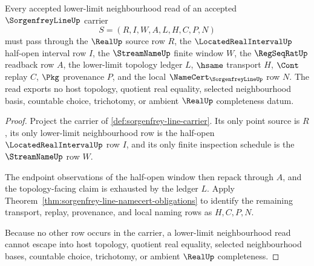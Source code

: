 \begin{theorem}
\label{thm:sorgenfrey-line-lower-limit-window-nonescape}
Every accepted lower-limit neighbourhood read of an accepted $\SorgenfreyLineUp$ carrier
$$
S=(R,I,W,A,L,H,C,P,N)
$$
must pass through the $\RealUp$ source row $R$, the $\LocatedRealIntervalUp$ half-open interval row $I$, the $\StreamNameUp$ finite window $W$, the $\RegSeqRatUp$ readback row $A$, the lower-limit topology ledger $L$, $\hsame$ transport $H$, $\Cont$ replay $C$, $\Pkg$ provenance $P$, and the local $\NameCert_{\SorgenfreyLineUp}$ row $N$. The read exports no host topology, quotient real equality, selected neighbourhood basis, countable choice, trichotomy, or ambient $\RealUp$ completeness datum.
\end{theorem}
\begin{proof}
Project the carrier of \autoref{def:sorgenfrey-line-carrier}. Its only point source is $R$, its only lower-limit neighbourhood row is the half-open $\LocatedRealIntervalUp$ row $I$, and its only finite inspection schedule is the $\StreamNameUp$ row $W$.

The endpoint observations of the half-open window then repack through $A$, and the topology-facing claim is exhausted by the ledger $L$. Apply Theorem~\ref{thm:sorgenfrey-line-namecert-obligations} to identify the remaining transport, replay, provenance, and local naming rows as $H,C,P,N$.

Because no other row occurs in the carrier, a lower-limit neighbourhood read cannot escape into host topology, quotient real equality, selected neighbourhood bases, countable choice, trichotomy, or ambient $\RealUp$ completeness.
\end{proof}

